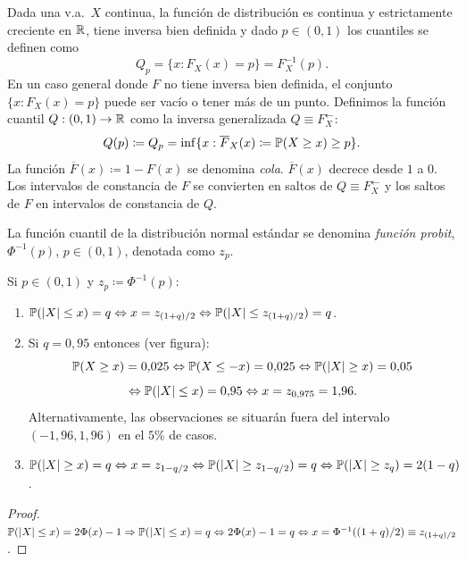 \begin{definicion}[60 — Cuantiles]
Dada una v.a.\ $X$ continua, la función de distribución es continua y estrictamente creciente en $\mathbb{R}$, tiene inversa bien definida y dado $p \in (0,1)$ los cuantiles se definen como
\[
  Q_p = \{x : F_X(x) = p\} = F_X^{-1}(p).
\]
En un caso general donde $F$ no tiene inversa bien definida, el conjunto $\{x : F_X(x) = p\}$ puede ser vacío o tener más de un punto. Definimos la función cuantil $Q : (0,1) \to \mathbb{R}$ como la inversa generalizada $Q \equiv F_X^{\leftarrow}$:
\[
  Q(p) \coloneqq Q_p = \inf\{x : \overline{F}_X(x) \coloneqq \mathbb{P}(X \ge x) \ge p\}.
\]
La función $\overline{F}(x) \coloneqq 1 - F(x)$ se denomina \emph{cola}. $\overline{F}(x)$ decrece desde $1$ a $0$. Los intervalos de constancia de $F$ se convierten en saltos de $Q \equiv F_X^{\leftarrow}$ y los saltos de $F$ en intervalos de constancia de $Q$.

La función cuantil de la distribución normal estándar se denomina \emph{función probit}, $\Phi^{-1}(p)$, $p \in (0,1)$, denotada como $z_p$.
\end{definicion}
\textcolor{azulresalt}{
\begin{proposicion}[60]
Si $p \in (0,1)$ y $z_p \coloneqq \Phi^{-1}(p)$:
\begin{enumerate}
  \item $\mathbb{P}(|X| \le x) = q \Leftrightarrow x = z_{(1+q)/2} \Leftrightarrow \mathbb{P}(|X| \le z_{(1+q)/2}) = q$.
  \item Si $q = 0{,}95$ entonces (ver figura):
        \[
          \mathbb{P}(X \ge x) = 0{,}025 \Leftrightarrow \mathbb{P}(X \le -x) = 0{,}025 \Leftrightarrow \mathbb{P}(|X| \ge x) = 0{,}05 \]
        \[ \Leftrightarrow \mathbb{P}(|X| \le x) = 0{,}95 \Leftrightarrow x = z_{0{,}975} = 1{,}96.
        \]
        Alternativamente, las observaciones se situarán fuera del intervalo $(-1{,}96, 1{,}96)$ en el $5\%$ de casos.
  \item $\mathbb{P}(|X| \ge x) = q \Leftrightarrow x = z_{1-q/2} \Leftrightarrow \mathbb{P}(|X| \ge z_{1-q/2}) = q \Leftrightarrow \mathbb{P}(|X| \ge z_q) = 2(1-q)$.
\end{enumerate}
\end{proposicion}}

\begin{proof}
$\mathbb{P}(|X| \le x) = 2\Phi(x) - 1 \Rightarrow \mathbb{P}(|X| \le x) = q \Leftrightarrow 2\Phi(x) - 1 = q \Leftrightarrow x = \Phi^{-1}((1+q)/2) \equiv z_{(1+q)/2}$.
\end{proof}

